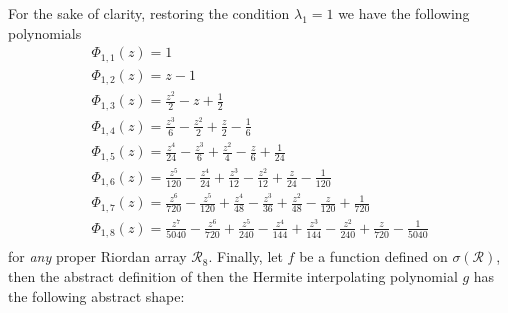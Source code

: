 For the sake of clarity, restoring the condition $\lambda_{1}=1$ we have the following polynomials
\begin{displaymath}
\begin{array}{c}
 \Phi_{ 1, 1 }{\left (z \right )} = 1\\
 \Phi_{ 1, 2 }{\left (z \right )} = z - 1\\
 \Phi_{ 1, 3 }{\left (z \right )} = \frac{z^{2}}{2} - z + \frac{1}{2}\\
 \Phi_{ 1, 4 }{\left (z \right )} = \frac{z^{3}}{6} - \frac{z^{2}}{2} + \frac{z}{2} - \frac{1}{6}\\
 \Phi_{ 1, 5 }{\left (z \right )} = \frac{z^{4}}{24} - \frac{z^{3}}{6} + \frac{z^{2}}{4} - \frac{z}{6} + \frac{1}{24}\\
 \Phi_{ 1, 6 }{\left (z \right )} = \frac{z^{5}}{120} - \frac{z^{4}}{24} + \frac{z^{3}}{12} - \frac{z^{2}}{12} + \frac{z}{24} - \frac{1}{120}\\
 \Phi_{ 1, 7 }{\left (z \right )} = \frac{z^{6}}{720} - \frac{z^{5}}{120} + \frac{z^{4}}{48} - \frac{z^{3}}{36} + \frac{z^{2}}{48} - \frac{z}{120} + \frac{1}{720}\\
 \Phi_{ 1, 8 }{\left (z \right )} = \frac{z^{7}}{5040} - \frac{z^{6}}{720} + \frac{z^{5}}{240} - \frac{z^{4}}{144} + \frac{z^{3}}{144} - \frac{z^{2}}{240} + \frac{z}{720} - \frac{1}{5040}\\
\end{array}
\end{displaymath}
for \textit{any} proper Riordan array $\mathcal{R}_{8}$. Finally, let $f$ be a
    function defined on $\sigma(\mathcal{R})$, then the abstract definition of
    then the Hermite interpolating polynomial $g$ has the following abstract shape:
